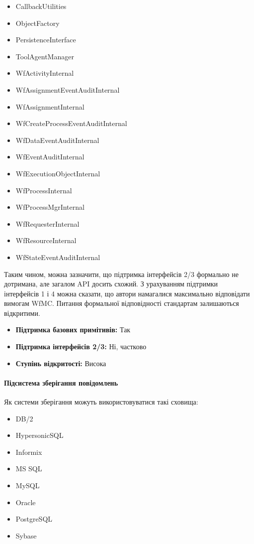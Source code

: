 \documentclass{memoir}
\begin{document}
\begin{itemize}
    \item CallbackUtilities
    \item ObjectFactory
    \item PersistenceInterface
    \item ToolAgentManager
    \item WfActivityInternal
    \item WfAssignmentEventAuditInternal
    \item WfAssignmentInternal
    \item WfCreateProcessEventAuditInternal
    \item WfDataEventAuditInternal
    \item WfEventAuditInternal
    \item WfExecutionObjectInternal
    \item WfProcessInternal
    \item WfProcessMgrInternal
    \item WfRequesterInternal
    \item WfResourceInternal
    \item WfStateEventAuditInternal
\end{itemize}

Таким чином, можна зазначити, що підтримка інтерфейсів 2/3 формально не дотримана, але загалом API досить схожий. З урахуванням підтримки інтерфейсів 1 і 4 можна сказати, що автори намагалися максимально відповідати вимогам WfMC. Питання формальної відповідності стандартам залишаються відкритими.

\begin{itemize}
    \item \textbf{Підтримка базових примітивів:} Так
    \item \textbf{Підтримка інтерфейсів 2/3:} Ні, частково
    \item \textbf{Ступінь відкритості:} Висока
\end{itemize}

\paragraph{Підсистема зберігання повідомлень}

Як системи зберігання можуть використовуватися такі сховища:

\begin{itemize}
    \item DB/2
    \item HypersonicSQL
    \item Informix
    \item MS SQL
    \item MySQL
    \item Oracle
    \item PostgreSQL
    \item Sybase
\end{itemize}
\end{document}
